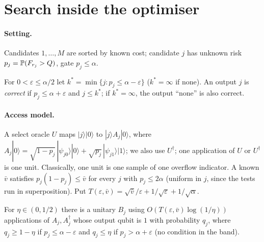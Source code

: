 \section{Search inside the optimiser}\label{app:search}

\paragraph{Setting.} Candidates $1,\dots,M$ are sorted by known cost; candidate $j$ has unknown risk $p_j=\P(F_{r_j}>Q)$, gate $p_j\le\alpha$.

\begin{definition}\label{def:ecf}
For $0<\varepsilon\le\alpha/2$ let $k^*=\min\{j:p_j\le\alpha-\varepsilon\}$ ($k^*=\infty$ if none). An output $j$ is \emph{correct} if $p_j\le\alpha+\varepsilon$ and $j\le k^*$; if $k^*=\infty$, the output ``none'' is also correct.
\end{definition}

\paragraph{Access model.} A select oracle $U$ maps $|j\rangle|0\rangle$ to $|j\rangle A_j|0\rangle$, where $A_j|0\rangle=\sqrt{1-p_j}\,|\psi_{j0}\rangle|0\rangle+\sqrt{p_j}\,|\psi_{j1}\rangle|1\rangle$; we also use $U^\dagger$; one application of $U$ or $U^\dagger$ is one unit. Classically, one unit is one sample of one overflow indicator. A known $\bar v$ satisfies $p_j(1-p_j)\le\bar v$ for every $j$ with $p_j\le2\alpha$ (uniform in $j$, since the tests run in superposition). Put $T(\varepsilon,\bar v)=\sqrt{\bar v}/\varepsilon+1/\sqrt\varepsilon+1/\sqrt\alpha$.

\begin{lemma}\label{lem:thr}
For $\eta\in(0,1/2)$ there is a unitary $B_j$ using $O(T(\varepsilon,\bar v)\log(1/\eta))$ applications of $A_j,A_j^\dagger$ whose output qubit is $1$ with probability $q_j$, where $q_j\ge1-\eta$ if $p_j\le\alpha-\varepsilon$ and $q_j\le\eta$ if $p_j>\alpha+\varepsilon$ (no condition in the band).
\end{lemma}
